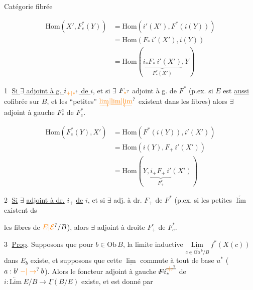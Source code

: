 Catégorie fibrée


\[
\begin{aligned}
\mathrm{Hom}(X',F_c^*(Y))&=\mathrm{Hom}(i'(X'),F^*(i(Y)))\\
&=\mathrm{Hom}(F_*\,i'(X'),i(Y))\\
&=\mathrm{Hom}(\underbrace{i_*F_*\,i'(X')}_{F_*^c(X')},Y)
\end{aligned}
\]

\textcircled{1} \uline{Si $\exists$ adjoint à g. $i_{\unsure{+|*}}$ de $i$}, et si $\exists$ $F_{\unsure{*}}$ adjoint
à g. de $F^*$ (p.ex. si $E$ est \uline{aussi} cofibrée
sur $B$, et les ``petites'' $\unsure{\underrightarrow{\lim}|\underline{\lim}|\underleftarrow{\lim}}$ existent dans les fibres)
alors $\exists$ adjoint à gauche $F_*^c$ de ${F}_c^*$.

\[
\begin{aligned}
\mathrm{Hom}(F_c^*(Y),X')&=\mathrm{Hom}(F^*(i(Y)),i'(X'))\\
&=\mathrm{Hom}(i(Y),F_+\,i'(X'))\\
&=\mathrm{Hom}(Y,\underbrace{i_+F_+\,i'}_{F_+^c}(X'))
\end{aligned}
\]

\textcircled{2} \uline{Si} $\exists$ \uline{adjoint à dr.} $i_+$ \uline{de} $i$, et si $\exists$ adj. à dr.
$F_+$ de $F^*$ (p.ex.  si les petites $\underleftarrow{\lim}$ existent ds


les fibres de $\unsure{E|\mathcal E}/B$), alors $\exists$ adjoint à droite $F_+^c$ de $F_c^*$.

\textcircled{3} \uline{Prop}. Supposons que pour  $b\in\mathrm{Ob}\,B$, la limite
inductive $\underset{c\in\mathrm{Ob}\,{}^b/B}{\underline{\mathrm{Lim}}}\ f^*(X(c))$ dans $E_b$ existe,
et supposons que cette $\underline{\lim}$ commute
à tout  de base $u^*$ ($a:b'\mathbin{\unsure{-|\to}}b$).
Alors le foncteur adjoint à gauche $\deleted{F}i_*^{\deleted{\unsure{c|\varepsilon}}}$
de  $i:\underleftarrow{\mathrm{Lim}}\ E/B\longrightarrow\underline{\Gamma}(B/E)$ existe,
et est donné par

